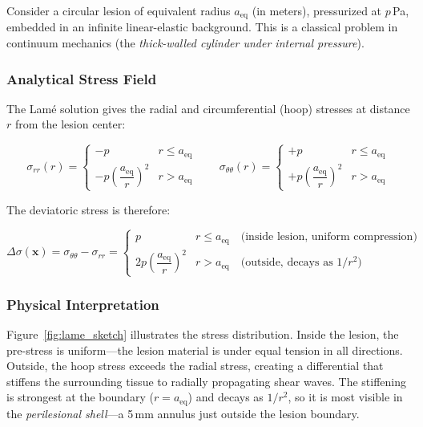 \documentclass[11pt,letterpaper]{article}
\newcommand{\xvec}{\bm{x}}
\newcommand{\Dsig}{\Delta\sigma}
\newcommand{\aeq}{a_{\mathrm{eq}}}
\begin{document}
Consider a circular lesion of equivalent radius $\aeq$ (in meters), pressurized at $p$\,Pa,
embedded in an infinite linear-elastic background. This is a classical problem in continuum
mechanics (the \emph{thick-walled cylinder under internal pressure}).

\subsubsection{Analytical Stress Field}

The Lam\'{e} solution gives the radial and circumferential (hoop) stresses at distance $r$
from the lesion center:

\[
    \sigma_{rr}(r) = \begin{cases}
        -p & r \leq \aeq \\[4pt]
        -p\left(\dfrac{\aeq}{r}\right)^2 & r > \aeq
    \end{cases}
    \qquad
    \sigma_{\theta\theta}(r) = \begin{cases}
        +p & r \leq \aeq \\[4pt]
        +p\left(\dfrac{\aeq}{r}\right)^2 & r > \aeq
    \end{cases}
\]

The deviatoric stress is therefore:
\begin{physicbox}
\begin{equation}\label{eq:lame}
    \Dsig(\xvec) = \sigma_{\theta\theta} - \sigma_{rr} =
    \begin{cases}
        p & r \leq \aeq \quad \text{(inside lesion, uniform compression)} \\[4pt]
        2p\!\left(\dfrac{\aeq}{r}\right)^{\!2} & r > \aeq \quad \text{(outside, decays as } 1/r^2\text{)}
    \end{cases}
\end{equation}
\end{physicbox}

\subsubsection{Physical Interpretation}

Figure~\ref{fig:lame_sketch} illustrates the stress distribution.
Inside the lesion, the pre-stress is uniform---the lesion material is under
equal tension in all directions. Outside, the hoop stress exceeds the
radial stress, creating a differential that stiffens the surrounding tissue to radially
propagating shear waves. The stiffening is strongest at the boundary ($r = \aeq$) and
decays as $1/r^2$, so it is most visible in the \emph{perilesional shell}---a 5\,mm
annulus just outside the lesion boundary.
\end{document}
